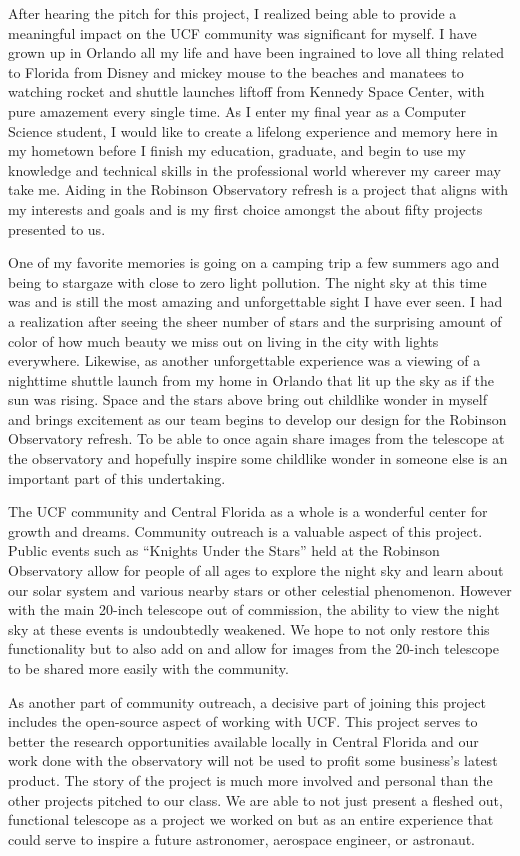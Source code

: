 \documentclass[12pt]{report}
\begin{document}
After hearing the pitch for this project, I realized being able to provide a meaningful impact on the UCF community was significant for myself.  I have grown up in Orlando all my life and have been ingrained to love all thing related to Florida from Disney and mickey mouse to the beaches and manatees to watching rocket and shuttle launches liftoff from Kennedy Space Center, with pure amazement every single time.  As I enter my final year as a Computer Science student, I would like to create a lifelong experience and memory here in my hometown before I finish my education, graduate, and begin to use my knowledge and technical skills in the professional world wherever my career may take me.  Aiding in the Robinson Observatory refresh is a project that aligns with my interests and goals and is my first choice amongst the about fifty projects presented to us.

One of my favorite memories is going on a camping trip a few summers ago and being to stargaze with close to zero light pollution.  The night sky at this time was and is still the most amazing and unforgettable sight I have ever seen.  I had a realization after seeing the sheer number of stars and the surprising amount of color of how much beauty we miss out on living in the city with lights everywhere.  Likewise, as another unforgettable experience was a viewing of a nighttime shuttle launch from my home in Orlando that lit up the sky as if the sun was rising.  Space and the stars above bring out childlike wonder in myself and brings excitement as our team begins to develop our design for the Robinson Observatory refresh.  To be able to once again share images from the telescope at the observatory and hopefully inspire some childlike wonder in someone else is an important part of this undertaking.

The UCF community and Central Florida as a whole is a wonderful center for growth and dreams.  Community outreach is a valuable aspect of this project.  Public events such as “Knights Under the Stars” held at the Robinson Observatory allow for people of all ages to explore the night sky and learn about our solar system and various nearby stars or other celestial phenomenon.  However with the main 20-inch telescope out of commission, the ability to view the night sky at these events is undoubtedly weakened.  We hope to not only restore this functionality but to also add on and allow for images from the 20-inch telescope to be shared more easily with the community.

As another part of community outreach, a decisive part of joining this project includes the open-source aspect of working with UCF.  This project serves to better the research opportunities available locally in Central Florida and our work done with the observatory will not be used to profit some business’s latest product.  The story of the project is much more involved and personal than the other projects pitched to our class.  We are able to not just present a fleshed out, functional telescope as a project we worked on but as an entire experience that could serve to inspire a future astronomer, aerospace engineer, or astronaut.
\end{document}
